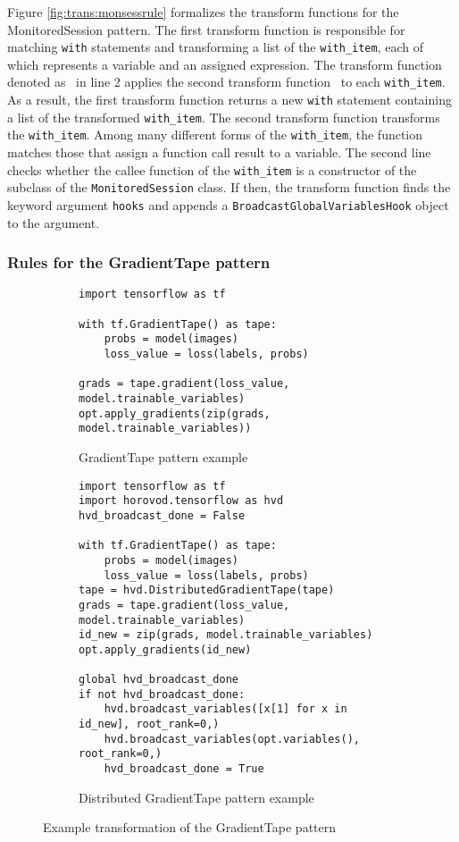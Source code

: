 \vspace{-1em}

Figure \ref{fig:trans:monsessrule} formalizes the transform functions for the
MonitoredSession pattern.
The first transform function is responsible for matching {\tt with} statements
and transforming a list of the {\tt with\_item}, each of which represents a
variable and an assigned expression. 
The transform function denoted as \fkwwithitem~in line 2 applies the second
transform function \fkwithitem~to each {\tt with\_item}.
As a result, the first transform function returns a new {\tt with} statement
containing a list of the transformed {\tt with\_item}.
The second transform function transforms the {\tt with\_item}.
Among many different forms of the {\tt with\_item}, the function matches those
that assign a function call result to a variable.
The second line checks whether the callee function of the {\tt with\_item} is a
constructor of the subclass of the {\tt MonitoredSession} class. 
If then, the transform function finds the keyword argument {\tt hooks} and
appends a {\tt BroadcastGlobalVariablesHook} object to the argument.

\subsubsection{Rules for the GradientTape pattern}\label{sec:grad}

\begin{figure}[ht!]
  \centering
  \begin{subfigure}[t]{0.4\textwidth}
    \begin{lstlisting}[style=mpython]
import tensorflow as tf

with tf.GradientTape() as tape:
    probs = model(images)
    loss_value = loss(labels, probs)

grads = tape.gradient(loss_value, model.trainable_variables)
opt.apply_gradients(zip(grads, model.trainable_variables))\end{lstlisting}
    \caption{GradientTape pattern example}
  \end{subfigure}
  \hspace{5mm}
  \begin{subfigure}[t]{0.55\textwidth}
    \begin{lstlisting}[style=mpython]
import tensorflow as tf
import horovod.tensorflow as hvd
hvd_broadcast_done = False

with tf.GradientTape() as tape:
    probs = model(images)
    loss_value = loss(labels, probs)
tape = hvd.DistributedGradientTape(tape)
grads = tape.gradient(loss_value, model.trainable_variables)
id_new = zip(grads, model.trainable_variables)
opt.apply_gradients(id_new)

global hvd_broadcast_done
if not hvd_broadcast_done:
    hvd.broadcast_variables([x[1] for x in id_new], root_rank=0,)
    hvd.broadcast_variables(opt.variables(), root_rank=0,)
    hvd_broadcast_done = True\end{lstlisting}
    \caption{Distributed GradientTape pattern example}
  \end{subfigure}
  \caption{Example transformation of the GradientTape pattern}
  \label{fig:trans:gtapetrans}
\end{figure}


